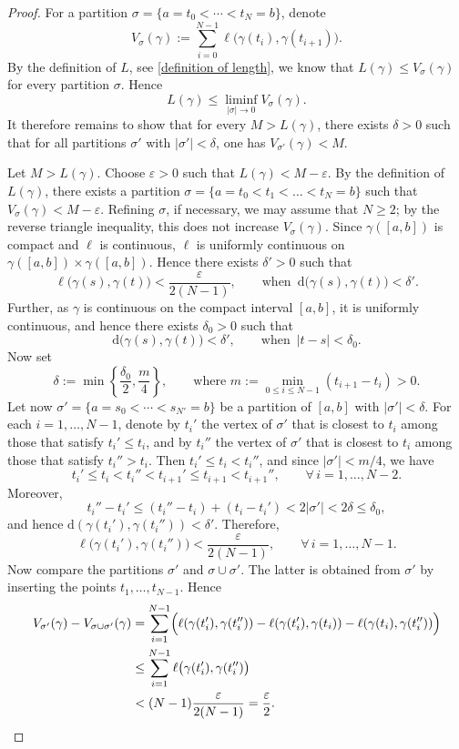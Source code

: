 \documentclass[hidelinks,12pt,a4paper]{article}
\numberwithin{equation}{section}
\theoremstyle{plain}
\theoremstyle{definition}
\newcommand{\eps}{\varepsilon}
\begin{document}
\begin{proof}
For a partition $\sigma=\{a=t_0<\cdots<t_N=b\}$, denote
\[
V_\sigma(\gamma):=\sum_{i=0}^{N-1}\ell\big(\gamma(t_i),\gamma(t_{i+1})\big).
\]
By the definition of $L$, see \eqref{definition of length}, we know that  $L(\gamma)\leq V_\sigma(\gamma)$ for every partition $\sigma$. Hence
\begin{equation}\label{liminf of length}
L(\gamma)\leq \liminf_{|\sigma|\to 0}V_\sigma(\gamma).
\end{equation}
It therefore remains to show that for every $M>L(\gamma)$, there exists $\delta>0$ such that for all partitions $\sigma'$ with $|\sigma'|<\delta$, one has $V_{\sigma'}(\gamma)<M.$

Let $M>L(\gamma)$. Choose $\varepsilon>0$ such that $L(\gamma)<M-\varepsilon$. 
By the definition of $L(\gamma)$, there exists a partition 
$\sigma=\{a=t_0<t_1<\ldots<t_N=b\}$ such that $V_\sigma(\gamma)<M-\varepsilon$. 
Refining $\sigma$, if necessary, we may assume that $N\ge 2$; by the reverse triangle inequality, this does not increase $V_\sigma(\gamma)$.
Since $\gamma([a,b])$ is compact and $\ell$ is continuous, $\ell$ is uniformly continuous on 
$\gamma([a,b])\times\gamma([a,b])$. Hence there exists $\delta'>0$ such that 
\[
\ell\big(\gamma(s),\gamma(t)\big)<\frac{\eps}{2(N-1)},\qquad \mathrm{when}\,\,\,\mathrm{d}\big(\gamma(s),\gamma(t)\big)<\delta'.
\]
Further, as $\gamma$ is continuous on the compact interval $[a,b]$, it is uniformly continuous, and hence there exists $\delta_0>0$ such that 
\[
\mathrm{d}\big(\gamma(s),\gamma(t)\big)<\delta',\qquad \mathrm{when}\,\,\,|t-s|<\delta_0.
\]
Now set
\[
\delta:=\min\left\{\frac{\delta_0}{2},\frac{m}{4}\right\},\qquad \mathrm{where}\,\,m:=\min_{0\le i\le N-1}(t_{i+1}-t_i)>0.
\]
Let now $\sigma'=\{a=s_0<\cdots<s_{N'}=b\}$ be a partition of $[a,b]$ with $|\sigma'|<\delta$. 
For each $i=1,\ldots,N-1$, denote by $t_i'$ the vertex of $\sigma'$ that is closest to $t_i$ among those that satisfy $t_i'\le t_i$, and by $t_i''$ the vertex of $\sigma'$ that is closest to $t_i$ among those that satisfy $t_i''>t_i$. Then $t_i'\le t_i<t_i''$, and since $|\sigma'|<m/4$, we have
\[
t_i'\le t_i<t_i''<t_{i+1}'\le t_{i+1}<t_{i+1}'',\qquad \forall \,i=1,\ldots,N-2.
\]
Moreover,
\[
t_i''-t_i'\le (t_i''-t_i)+(t_i-t_i')<2|\sigma'|<2\delta\le \delta_0,
\]
and hence $\mathrm{d}(\gamma(t_i'),\gamma(t_i''))<\delta'.$
Therefore,
\[
\ell\big(\gamma(t_i'),\gamma(t_i'')\big)<\frac{\eps}{2(N-1)},
\qquad\forall \,i=1,\ldots,N-1.
\]
Now compare the partitions $\sigma'$ and $\sigma\cup\sigma'$. The latter is obtained from $\sigma'$ by inserting the points $t_1,\ldots,t_{N-1}$. Hence
\begin{align*}
V_{\sigma'}(\gamma)-V_{\sigma\cup\sigma'}(\gamma)
&=
\sum_{i=1}^{N-1}
\Bigl(
\ell(\gamma(t_i'),\gamma(t_i''))
-\ell(\gamma(t_i'),\gamma(t_i))
-\ell(\gamma(t_i),\gamma(t_i''))
\Bigr) \\
&\le
\sum_{i=1}^{N-1}\ell\big(\gamma(t_i'),\gamma(t_i'')\big) \\
&<
(N-1)\frac{\eps}{2(N-1)}
=
\frac{\eps}{2}.
\end{align*}


\end{proof}
\end{document}
